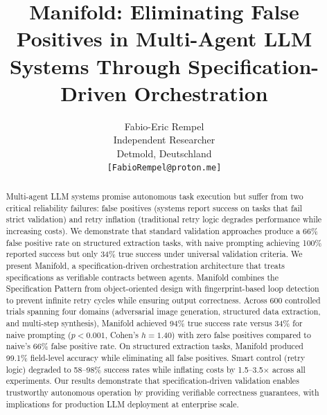 \documentclass{article}
\title{Manifold: Eliminating False Positives in Multi-Agent LLM Systems Through Specification-Driven Orchestration}
\author{%
  Fabio-Eric Rempel \\
  Independent Researcher \\
  Detmold, Deutschland \\
  \texttt{[FabioRempel@proton.me]} \\
}
\begin{document}
\maketitle
\begin{abstract}
Multi-agent LLM systems promise autonomous task execution but suffer from two critical reliability failures: false positives (systems report success on tasks that fail strict validation) and retry inflation (traditional retry logic degrades performance while increasing costs). We demonstrate that standard validation approaches produce a 66\% false positive rate on structured extraction tasks, with naive prompting achieving 100\% reported success but only 34\% true success under universal validation criteria.
We present Manifold, a specification-driven orchestration architecture that treats specifications as verifiable contracts between agents. Manifold combines the Specification Pattern from object-oriented design with fingerprint-based loop detection to prevent infinite retry cycles while ensuring output correctness.
Across 600 controlled trials spanning four domains (adversarial image generation, structured data extraction, and multi-step synthesis), Manifold achieved 94\% true success rate versus 34\% for naive prompting ($p < 0.001$, Cohen's $h = 1.40$) with zero false positives compared to naive's 66\% false positive rate. On structured extraction tasks, Manifold produced 99.1\% field-level accuracy while eliminating all false positives. Smart control (retry logic) degraded to 58--98\% success rates while inflating costs by 1.5--3.5$\times$ across all experiments.
Our results demonstrate that specification-driven validation enables trustworthy autonomous operation by providing verifiable correctness guarantees, with implications for production LLM deployment at enterprise scale.
\end{abstract}

\end{document}
